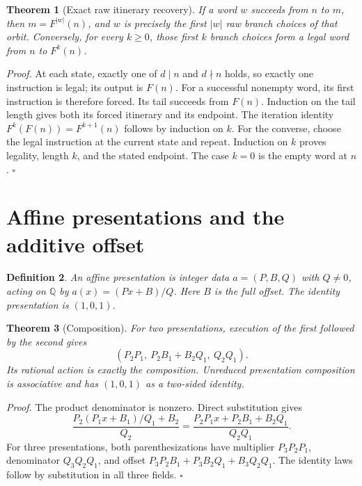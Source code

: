 \documentclass[11pt,letterpaper]{article}
\newcommand{\Q}{\mathbb{Q}}
\newtheorem{theorem}{Theorem}
\newtheorem{definition}[theorem]{Definition}
\newenvironment{proof}{\noindent\textit{Proof.}}{\hfill\(\square\)}
\begin{document}
\begin{theorem}[Exact raw itinerary recovery]
If a word \(w\) succeeds from \(n\) to \(m\), then
\(m=F^{|w|}(n)\), and \(w\) is precisely the first \(|w|\) raw branch choices of
that orbit. Conversely, for every \(k\ge0\), those first \(k\) branch choices form
a legal word from \(n\) to \(F^k(n)\).
\end{theorem}
\begin{proof}
At each state, exactly one of \(d\mid n\) and \(d\nmid n\) holds, so exactly one
instruction is legal; its output is \(F(n)\). For a successful nonempty word,
its first instruction is therefore forced. Its tail succeeds from \(F(n)\).
Induction on the tail length gives both its forced itinerary and its endpoint.
The iteration identity \(F^k(F(n))=F^{k+1}(n)\) follows by induction on \(k\).
For the converse, choose the legal instruction at the current state and repeat.
Induction on \(k\) proves legality, length \(k\), and the stated endpoint.
The case \(k=0\) is the empty word at \(n\).
\end{proof}

\section{Affine presentations and the additive offset}

\begin{definition}
An affine presentation is integer data \(a=(P,B,Q)\) with \(Q\ne0\), acting on
\(\Q\) by \(a(x)=(Px+B)/Q\). Here \(B\) is the \emph{full} offset.
The identity presentation is \((1,0,1)\).
\end{definition}

\begin{theorem}[Composition]
For two presentations, execution of the first followed by the second gives
\[
(P_2P_1,\ P_2B_1+B_2Q_1,\ Q_2Q_1).
\]
Its rational action is exactly the composition. Unreduced presentation composition
is associative and has \((1,0,1)\) as a two-sided identity.
\end{theorem}
\begin{proof}
The product denominator is nonzero. Direct substitution gives
\[
\frac{P_2(P_1x+B_1)/Q_1+B_2}{Q_2}
=\frac{P_2P_1x+P_2B_1+B_2Q_1}{Q_2Q_1}.
\]
For three presentations, both parenthesizations have multiplier \(P_3P_2P_1\),
denominator \(Q_3Q_2Q_1\), and offset
\(P_3P_2B_1+P_3B_2Q_1+B_3Q_2Q_1\).
The identity laws follow by substitution in all three fields.
\end{proof}
\end{document}

